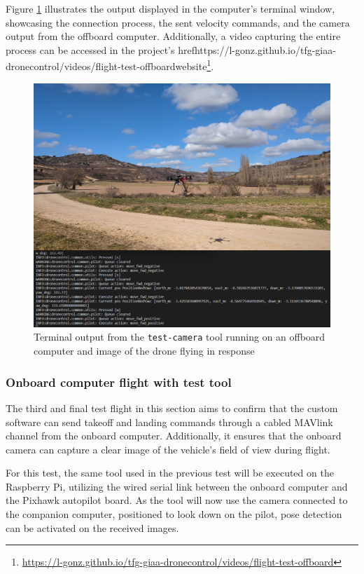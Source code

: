 Figure \ref{fig:flight-test-cam-offboard} illustrates the output displayed in the computer's terminal window, showcasing the connection process, the sent velocity commands, and the camera output from the offboard computer. Additionally, a video capturing the entire process can be accessed in the project's href{https://l-gonz.github.io/tfg-giaa-dronecontrol/videos/flight-test-offboard}{website}\footnote{\url{https://l-gonz.github.io/tfg-giaa-dronecontrol/videos/flight-test-offboard}}.

\begin{figure}
  \centering
  \includegraphics[width=\textwidth, keepaspectratio]{img/video-field-test-offboard.png}
  \caption{Terminal output from the \texttt{test-camera} tool running on an offboard computer and image of the drone flying in response}
  \label{fig:flight-test-cam-offboard}
\end{figure}

\subsubsection{Onboard computer flight with test tool}
\label{subsec:fl-test-3}


The third and final test flight in this section aims to confirm that the custom software can send takeoff and landing commands through a cabled MAVlink channel from the onboard computer. Additionally, it ensures that the onboard camera can capture a clear image of the vehicle's field of view during flight.

For this test, the same tool used in the previous test will be executed on the Raspberry Pi, utilizing the wired serial link between the onboard computer and the Pixhawk autopilot board. As the tool will now use the camera connected to the companion computer, positioned to look down on the pilot, pose detection can be activated on the received images.


